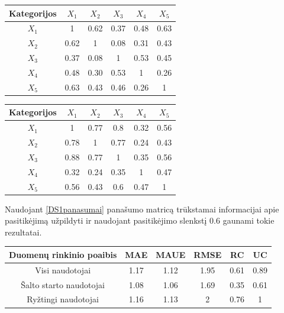\documentclass{VUMIFInfMagistrinis}
\begin{document}
\begin{center}
	\begin{tabular}{||c c c c c c||} 
		\hline
		Kategorijos & $X_1$ & $X_2$ & $X_3$ & $X_4$ & $X_5$ \\ [0.5ex] 
		\hline\hline
		$X_1$ & 1 & 0.62 & 0.37 & 0.48 & 0.63 \\ 
		\hline
		$X_2$ & 0.62 & 1 & 0.08 & 0.31 & 0.43 \\
		\hline
		$X_3$ & 0.37 & 0.08 & 1 & 0.53 & 0.45 \\
		\hline
		$X_4$ & 0.48 & 0.30 & 0.53 & 1 & 0.26 \\
		\hline
		$X_5$ & 0.63 & 0.43 & 0.46 & 0.26 & 1 \\ [1ex] 
		\hline
	\end{tabular}\label{DS1panasumai}
\end{center}
\begin{center}
	\begin{tabular}{||c c c c c c||} 
		\hline
		Kategorijos & $X_1$ & $X_2$ & $X_3$ & $X_4$ & $X_5$ \\ [0.5ex] 
		\hline\hline
		$X_1$ & 1 & 0.77 & 0.8 & 0.32 & 0.56 \\ 
		\hline
		$X_2$ & 0.78 & 1 & 0.77 & 0.24 & 0.43 \\
		\hline
		$X_3$ & 0.88 & 0.77 & 1 & 0.35 & 0.56 \\
		\hline
		$X_4$ & 0.32 & 0.24 & 0.35 & 1 & 0.47 \\
		\hline
		$X_5$ & 0.56 & 0.43 & 0.6 & 0.47 & 1 \\ [1ex] 
		\hline
	\end{tabular}\label{DS1koreliacijos}
\end{center}
\indent
Naudojant \ref{DS1panasumai} panašumo matricą trūkstamai informacijai apie pasitikėjimą užpildyti ir naudojant pasitikėjimo slenkstį 0.6 gaunami tokie rezultatai.
\begin{center}
	\begin{tabular}{||c c c c c c||} 
		Duomenų rinkinio poaibis & MAE & MAUE & RMSE & RC & UC \\
		\hline
		Visi naudotojai & 1.17 & 1.12 & 1.95 & 0.61 & 0.89 \\
		\hline
		Šalto starto naudotojai & 1.08 & 1.06 & 1.69 & 0.35 & 0.61 \\
		\hline
		Ryžtingi naudotojai & 1.16 & 1.13 & 2 & 0.76 & 1 \\
	\end{tabular}
\end{center}
\end{document}
